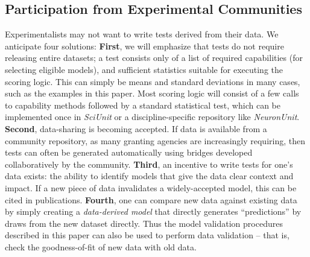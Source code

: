\documentclass{frontiersSCNS}
\begin{document}
\subsection{Participation from Experimental Communities}
Experimentalists may not want to write tests derived from their data.  
We anticipate four solutions: 
\textbf{First}, we will emphasize that tests do not require releasing entire datasets; a test consists only of a list of required  capabilities (for selecting eligible models), and sufficient statistics suitable for executing the scoring logic. This can simply be means and standard deviations in many cases, such as the examples in this paper. Most scoring logic will consist of a few calls to capability methods followed by a standard statistical test, which can be implemented once in \textit{SciUnit} or a discipline-specific repository like \textit{NeuronUnit}.
\textbf{Second}, data-sharing is becoming accepted. If data is available from a community repository, as many granting agencies are increasingly requiring, then tests can often be generated automatically using bridges developed collaboratively by the community. 
\textbf{Third}, an incentive to write tests for one's data exists: the ability to identify models that give the data clear context and impact. If a new piece of data invalidates a widely-accepted model, this can be cited in publications.  
\textbf{Fourth}, one can compare new data against existing data by simply creating a \emph{data-derived model} that directly generates ``predictions'' by draws from the new dataset directly. Thus the model validation procedures described in this paper can also be used to perform data validation -- that is, check the goodness-of-fit of new data with old data.
\end{document}

